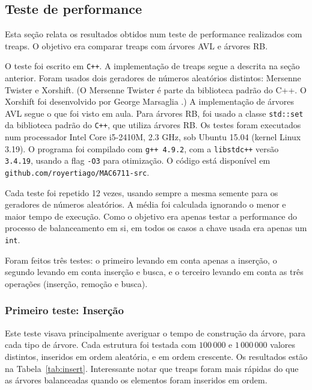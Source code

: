 \subsection{Teste de performance}
Esta seção relata os resultados obtidos num teste de performance realizados com treaps.
O objetivo era comparar treaps com árvores AVL e árvores RB.

O teste foi escrito em \texttt{C++}.
A implementação de treaps segue a descrita na seção anterior.
Foram usados dois geradores de números aleatórios distintos:
Mersenne Twister e Xorshift.
(O Mersenne Twister é parte da biblioteca padrão do C++.
O Xorshift foi desenvolvido por George Marsaglia \cite{Marsaglia2003}.)
A implementação de árvores AVL segue o que foi visto em aula.
Para árvores RB,
foi usado a classe \texttt{std::set} da biblioteca padrão do \texttt{C++},
que utiliza árvores RB.
Os testes foram executados num processador Intel Core i5-2410M, 2.3 GHz,
sob Ubuntu 15.04 (kernel Linux 3.19).
O programa foi compilado com \texttt{g++ 4.9.2},
com a \texttt{libstdc++} versão \texttt{3.4.19},
usando a flag \texttt{-O3} para otimização.
O código está disponível em \verb"github.com/royertiago/MAC6711-src".

Cada teste foi repetido 12 vezes,
usando sempre a mesma semente para os geradores de números aleatórios.
A média foi calculada ignorando o menor e maior tempo de execução.
Como o objetivo era apenas testar a performance do processo de balanceamento em si,
em todos os casos a chave usada era apenas um \texttt{int}.

Foram feitos três testes: o primeiro levando em conta apenas a inserção,
o segundo levando em conta inserção e busca,
e o terceiro levando em conta as três operações
(inserção, remoção e busca).

\subsubsection{Primeiro teste: Inserção}

Este teste visava principalmente averiguar o tempo de construção da árvore,
para cada tipo de árvore.
Cada estrutura foi testada com $100\,000$ e $1\,000\,000$ valores distintos,
inseridos em ordem aleatória, e em ordem crescente.
Os resultados estão na Tabela~\ref{tab:insert}.
Interessante notar que treaps foram mais rápidas do que as árvores balanceadas
quando os elementos foram inseridos em ordem.

